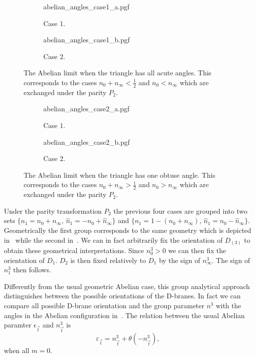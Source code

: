\begin{figure}[tbp]
  \centering
  \begin{subfigure}[b]{0.45\linewidth}
    \centering
    {abelian_angles_case1_a.pgf}
    \caption{Case 1.}
  \end{subfigure}
  \hfill
  \begin{subfigure}[b]{0.45\linewidth}
    \centering
    {abelian_angles_case1_b.pgf}
    \caption{Case 2.}
  \end{subfigure}
  \caption{%
    The Abelian limit when the triangle has all acute angles.
    This corresponds to the cases  $n_{0} + n_{\infty}< \frac{1}{2}$ and $n_{0}< n_{\infty}$ which are exchanged under the parity $P_2$.}
  \label{fig:Abelian_angles_1}
\end{figure}

\begin{figure}[tbp]
  \centering
  \begin{subfigure}[b]{0.45\linewidth}
    \centering
    {abelian_angles_case2_a.pgf}
    \caption{Case 1.}
  \end{subfigure}
  \hfill
  \begin{subfigure}[b]{0.45\linewidth}
    \centering
    {abelian_angles_case2_b.pgf}
    \caption{Case 2.}
  \end{subfigure}
  \caption{%
    The Abelian limit when the triangle has one obtuse angle.
    This corresponds to the cases $n_{0} + n_{\infty}> \frac{1}{2}$ and $n_{0}> n_{\infty}$ which are exchanged under the parity $P_2$.}
  \label{fig:Abelian_angles_2}
\end{figure}

Under the parity transformation $P_2$ the previous four cases are grouped
into two sets $\{ n_{1} = n_{0} + n_{\infty},\, \hat{n}_{1} = -n_{0} + \hat{n}_{\infty} \}$ and $\{ n_{1} = 1 - (n_{0} + n_{\infty}),\, \hat{n}_{1} = n_{0} - \hat{n}_{\infty} \}$.
Geometrically the first group corresponds to the same geometry which is depicted in~ while the second in~.
We can in fact arbitrarily fix the orientation of $D_{(3)}$ to obtain these geometrical interpretations.
Since $n^3_{0} > 0$ we can then fix the orientation of $D_{{1}}$.
$D_{{2}}$ is then fixed relatively to $D_{{1}}$ by the sign of $n^3_{\infty}$.
The sign of $n^3_{1}$ then follows.

Differently from the usual geometric Abelian case, this group analytical approach distinguishes between the possible orientations of the D-branes.
In fact we can compare all possible D-brane orientation and the group parameter $n^3$ with the angles in the Abelian configuration in~.
The relation between the usual Abelian paramter $\epsilon_{\vec{t}}$ and $n_{\vec{t}}^3$ is
\begin{equation}
  \varepsilon_{\vec{t}}
  =
  n_{\vec{t}}^3 + \theta(-n^3_{\vec{t}})
  \label{eq:Abelian_vs_n_simple_case},
\end{equation}
when all $m = 0$.

